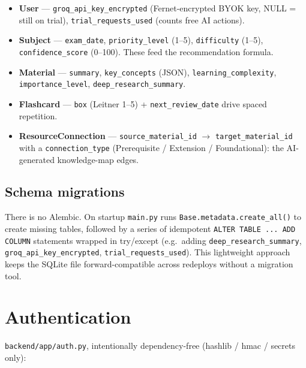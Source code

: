 \documentclass[11pt,a4paper]{article}
\newcommand{\code}[1]{\colorbox{fbCream}{\texttt{\small #1}}}
\begin{document}
\begin{itemize}[leftmargin=1.4em]
\item \textbf{User} --- \code{groq\_api\_key\_encrypted} (Fernet-encrypted BYOK
  key, NULL = still on trial), \code{trial\_requests\_used} (counts free AI
  actions).
\item \textbf{Subject} --- \code{exam\_date}, \code{priority\_level} (1--5),
  \code{difficulty} (1--5), \code{confidence\_score} (0--100). These feed the
  recommendation formula.
\item \textbf{Material} --- \code{summary}, \code{key\_concepts} (JSON),
  \code{learning\_complexity}, \code{importance\_level},
  \code{deep\_research\_summary}.
\item \textbf{Flashcard} --- \code{box} (Leitner 1--5) + \code{next\_review\_date}
  drive spaced repetition.
\item \textbf{ResourceConnection} --- \code{source\_material\_id} $\rightarrow$
  \code{target\_material\_id} with a \code{connection\_type}
  (Prerequisite / Extension / Foundational): the AI-generated knowledge-map edges.
\end{itemize}

\subsection{Schema migrations}

There is no Alembic. On startup \code{main.py} runs
\code{Base.metadata.create\_all()} to create missing tables, followed by a series
of idempotent \code{ALTER TABLE ... ADD COLUMN} statements wrapped in try/except
(e.g.\ adding \code{deep\_research\_summary}, \code{groq\_api\_key\_encrypted},
\code{trial\_requests\_used}). This lightweight approach keeps the SQLite file
forward-compatible across redeploys without a migration tool.

\section{Authentication}

\code{backend/app/auth.py}, intentionally dependency-free (hashlib / hmac /
secrets only):
\end{document}
